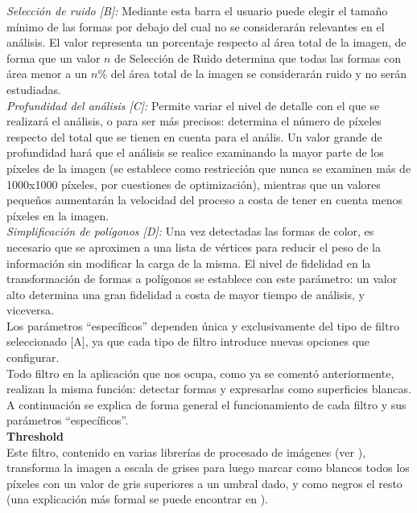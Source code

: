 		\noindent\textit{Selección de ruido [B]:} Mediante esta barra el usuario puede elegir el tamaño mínimo de las formas por debajo del cual no se considerarán relevantes en el análisis. El valor representa un porcentaje respecto al área total de la imagen, de forma que un valor $n$ de Selección de Ruido determina que todas las formas con área menor a un $n$\% del área total de la imagen se considerarán ruido y no serán estudiadas.\\
		
		\noindent\textit{Profundidad del análisis [C]:} Permite variar el nivel de detalle con el que se realizará el análisis, o para ser más precisos: determina el número de píxeles respecto del total que se tienen en cuenta para el anális. Un valor grande de profundidad hará que el análisis se realice examinando la mayor parte de los píxeles de la imagen (se establece como restricción que nunca se examinen más de 1000x1000 píxeles, por cuestiones de optimización), mientras que un valores pequeños aumentarán la velocidad del proceso a costa de tener en cuenta menos píxeles en la imagen.\\
		
		\noindent\textit{Simplificación de polígonos [D]:} Una vez detectadas las formas de color, es necesario que se aproximen a una lista de vértices para reducir el peso de la información sin modificar la carga de la misma. El nivel de fidelidad en la transformación de formas a polígonos se establece con este parámetro: un valor alto determina una gran fidelidad a costa de mayor tiempo de análisis, y viceversa.\\

		
		\vspace{0.2in}Los parámetros ``específicos'' dependen única y exclusivamente del tipo de filtro seleccionado [A], ya que cada tipo de filtro introduce nuevas opciones que configurar. \\
		
		Todo filtro en la aplicación que nos ocupa, como ya se comentó anteriormente, realizan la misma función: detectar formas y expresarlas como superficies blancas. A continuación se explica de forma general el funcionamiento de cada filtro y sus parámetros ``específicos''.\\
		
	\noindent\textbf{Threshold}\\
		
		Este filtro, contenido en varias librerías de procesado de imágenes (ver \cite{opencvDoc}), transforma la imagen a escala de grises para luego marcar como blancos todos los píxeles con un valor de gris superiores a un umbral dado, y como negros el resto (una explicación más formal se puede encontrar en \cite{pajares}).\\
		
